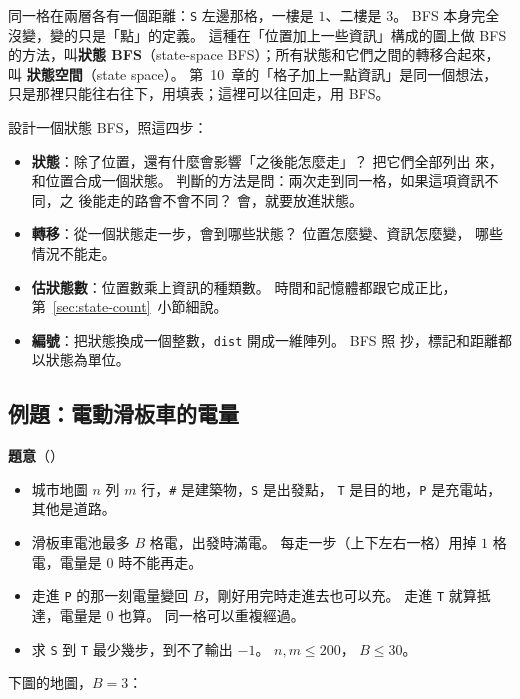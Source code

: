 同一格在兩層各有一個距離：\texttt{S} 左邊那格，一樓是 $1$、二樓是 $3$。 BFS
本身完全沒變，變的只是「點」的定義。 這種在「位置加上一些資訊」構成的圖上做
BFS 的方法，叫\textbf{狀態 BFS}（state-space BFS）；所有狀態和它們之間的轉移合起來，叫
\textbf{狀態空間}（state space）。 第~10~章的「格子加上一點資訊」是同一個想法，
只是那裡只能往右往下，用填表；這裡可以往回走，用 BFS。

設計一個狀態 BFS，照這四步：

\begin{itemize}
\item \textbf{狀態}：除了位置，還有什麼會影響「之後能怎麼走」？ 把它們全部列出
來，和位置合成一個狀態。 判斷的方法是問：兩次走到同一格，如果這項資訊不同，之
後能走的路會不會不同？ 會，就要放進狀態。
\item \textbf{轉移}：從一個狀態走一步，會到哪些狀態？ 位置怎麼變、資訊怎麼變，
哪些情況不能走。
\item \textbf{估狀態數}：位置數乘上資訊的種類數。 時間和記憶體都跟它成正比，
第~\ref{sec:state-count}~小節細說。
\item \textbf{編號}：把狀態換成一個整數，\texttt{dist} 開成一維陣列。 BFS 照
抄，標記和距離都以狀態為單位。
\end{itemize}

\subsection{例題：電動滑板車的電量}
\label{sec:ex-scooter}

\textbf{題意}（）

\begin{itemize}
\item 城市地圖 $n$ 列 $m$ 行，\texttt{\#} 是建築物，\texttt{S} 是出發點，
\texttt{T} 是目的地，\texttt{P} 是充電站，其他是道路。
\item 滑板車電池最多 $B$ 格電，出發時滿電。 每走一步（上下左右一格）用掉 $1$ 格
電，電量是 $0$ 時不能再走。
\item 走進 \texttt{P} 的那一刻電量變回 $B$，剛好用完時走進去也可以充。 走進
\texttt{T} 就算抵達，電量是 $0$ 也算。 同一格可以重複經過。
\item 求 \texttt{S} 到 \texttt{T} 最少幾步，到不了輸出 $-1$。 $n, m \le 200$，
$B \le 30$。
\end{itemize}

下圖的地圖，$B = 3$：

\begin{center}
\par\nopagebreak
{}
\label{fig:scooter}
\end{center}

